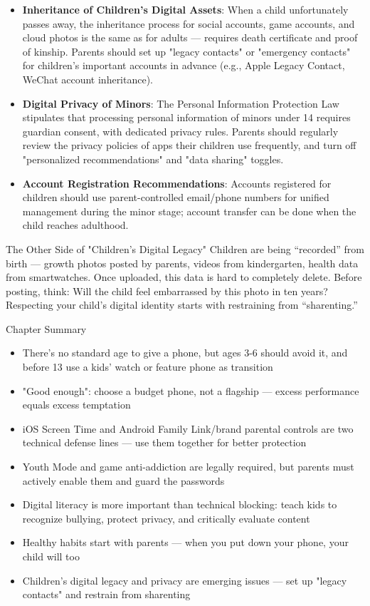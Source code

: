 \begin{itemize}
  \item \textbf{Inheritance of Children's Digital Assets}: When a child unfortunately passes away, the inheritance process for social accounts, game accounts, and cloud photos is the same as for adults — requires death certificate and proof of kinship. Parents should set up "legacy contacts" or "emergency contacts" for children's important accounts in advance (e.g., Apple Legacy Contact, WeChat account inheritance).
  \item \textbf{Digital Privacy of Minors}: The Personal Information Protection Law stipulates that processing personal information of minors under 14 requires guardian consent, with dedicated privacy rules. Parents should regularly review the privacy policies of apps their children use frequently, and turn off "personalized recommendations" and "data sharing" toggles.
  \item \textbf{Account Registration Recommendations}: Accounts registered for children should use parent-controlled email/phone numbers for unified management during the minor stage; account transfer can be done when the child reaches adulthood.
\end{itemize}

\begin{tcbwarn}{The Other Side of "Children's Digital Legacy"}
Children are being “recorded” from birth — growth photos posted by parents, videos from kindergarten, health data from smartwatches. Once uploaded, this data is hard to completely delete. Before posting, think: Will the child feel embarrassed by this photo in ten years? Respecting your child's digital identity starts with restraining from “sharenting.”

\end{tcbwarn}

\begin{tcbsummary}{Chapter Summary}
\begin{itemize}
  \item There's no standard age to give a phone, but ages 3-6 should avoid it, and before 13 use a kids' watch or feature phone as transition
  \item "Good enough": choose a budget phone, not a flagship — excess performance equals excess temptation
  \item iOS Screen Time and Android Family Link/brand parental controls are two technical defense lines — use them together for better protection
  \item Youth Mode and game anti-addiction are legally required, but parents must actively enable them and guard the passwords
  \item Digital literacy is more important than technical blocking: teach kids to recognize bullying, protect privacy, and critically evaluate content
  \item Healthy habits start with parents — when you put down your phone, your child will too
  \item Children's digital legacy and privacy are emerging issues — set up "legacy contacts" and restrain from sharenting
\end{itemize}

\end{tcbsummary}
